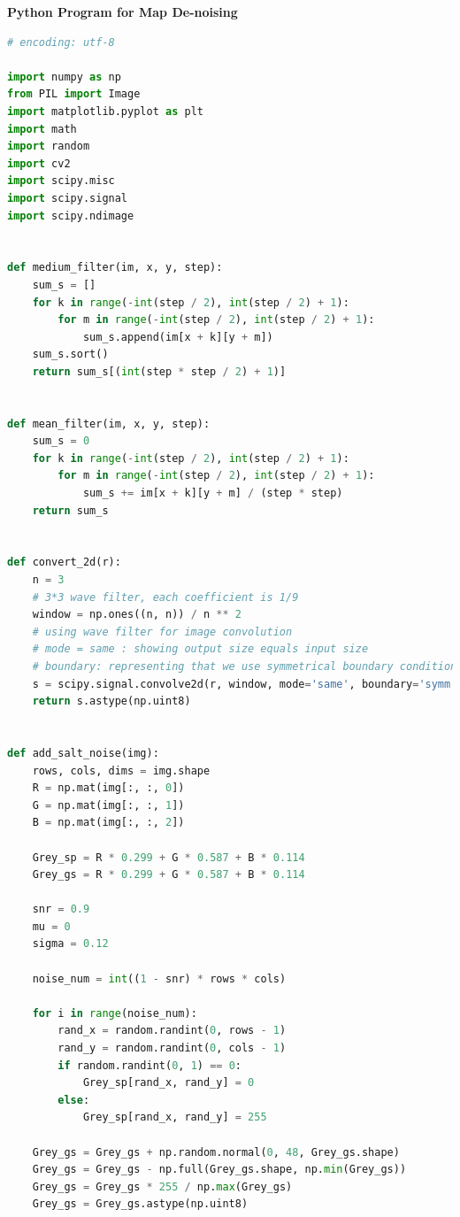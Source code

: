 \documentclass{mcmthesis}
\begin{document}
\noindent\textbf{\Large{Python Program for Map De-noising}}
\lstset{
basicstyle=\sffamily,
keywordstyle=\bfseries,
commentstyle=\rmfamily\itshape,
stringstyle=\ttfamily,
flexiblecolumns,
numbers=left,
numberstyle=\footnotesize}
\begin{lstlisting}[language=Python]
# encoding: utf-8

import numpy as np
from PIL import Image
import matplotlib.pyplot as plt
import math
import random
import cv2
import scipy.misc
import scipy.signal
import scipy.ndimage


def medium_filter(im, x, y, step):
    sum_s = []
    for k in range(-int(step / 2), int(step / 2) + 1):
        for m in range(-int(step / 2), int(step / 2) + 1):
            sum_s.append(im[x + k][y + m])
    sum_s.sort()
    return sum_s[(int(step * step / 2) + 1)]


def mean_filter(im, x, y, step):
    sum_s = 0
    for k in range(-int(step / 2), int(step / 2) + 1):
        for m in range(-int(step / 2), int(step / 2) + 1):
            sum_s += im[x + k][y + m] / (step * step)
    return sum_s


def convert_2d(r):
    n = 3
    # 3*3 wave filter, each coefficient is 1/9
    window = np.ones((n, n)) / n ** 2
    # using wave filter for image convolution
    # mode = same : showing output size equals input size
    # boundary: representing that we use symmetrical boundary conditions to process image edges
    s = scipy.signal.convolve2d(r, window, mode='same', boundary='symm')
    return s.astype(np.uint8)


def add_salt_noise(img):
    rows, cols, dims = img.shape
    R = np.mat(img[:, :, 0])
    G = np.mat(img[:, :, 1])
    B = np.mat(img[:, :, 2])

    Grey_sp = R * 0.299 + G * 0.587 + B * 0.114
    Grey_gs = R * 0.299 + G * 0.587 + B * 0.114

    snr = 0.9
    mu = 0
    sigma = 0.12

    noise_num = int((1 - snr) * rows * cols)

    for i in range(noise_num):
        rand_x = random.randint(0, rows - 1)
        rand_y = random.randint(0, cols - 1)
        if random.randint(0, 1) == 0:
            Grey_sp[rand_x, rand_y] = 0
        else:
            Grey_sp[rand_x, rand_y] = 255

    Grey_gs = Grey_gs + np.random.normal(0, 48, Grey_gs.shape)
    Grey_gs = Grey_gs - np.full(Grey_gs.shape, np.min(Grey_gs))
    Grey_gs = Grey_gs * 255 / np.max(Grey_gs)
    Grey_gs = Grey_gs.astype(np.uint8)


\end{lstlisting}
\end{document}
